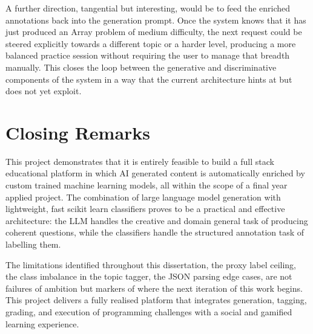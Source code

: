 A further direction, tangential but interesting, would be to feed the
enriched annotations back into the generation prompt. Once the system
knows that it has just produced an Array problem of medium difficulty,
the next request could be steered explicitly towards a different
topic or a harder level, producing a more balanced practice session
without requiring the user to manage that breadth manually. This
closes the loop between the generative and discriminative components
of the system in a way that the current architecture hints at but
does not yet exploit.

\section{Closing Remarks}

This project demonstrates that it is entirely feasible to build a full
stack educational platform in which AI generated content is
automatically enriched by custom trained machine learning models, all
within the scope of a final year applied project. The combination of
large language model generation with lightweight, fast scikit learn
classifiers \cite{pedregosa2011} proves to be a practical and
effective architecture: the LLM handles the creative and domain
general task of producing coherent questions, while the classifiers
handle the structured annotation task of labelling them.

The limitations identified throughout this dissertation, the proxy
label ceiling, the class imbalance in the topic tagger, the JSON
parsing edge cases, are not failures of ambition but markers of where
the next iteration of this work begins. This project delivers a fully realised platform that integrates generation, tagging, grading, and execution of programming challenges with a social and gamified learning experience.